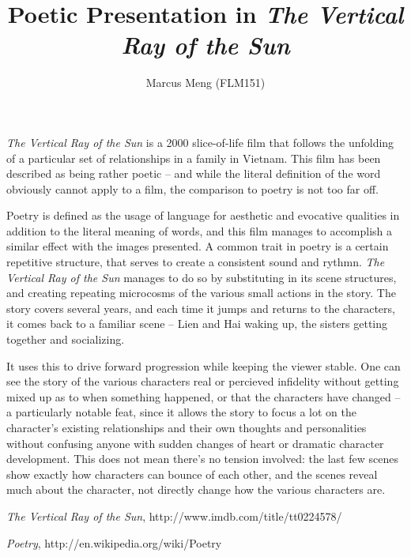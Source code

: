 \documentclass{article}
\title{Poetic Presentation in \emph{The Vertical Ray of the Sun}}
\author{Marcus Meng (FLM151)}
\begin{document}
\maketitle

\emph{The Vertical Ray of the Sun} is a 2000 slice-of-life film that follows the unfolding of a particular set of relationships in a family in Vietnam.
This film has been described as being rather poetic -- and while the literal definition of the word obviously cannot apply to a film, the comparison to poetry is not too far off.

Poetry is defined as the usage of language for aesthetic and evocative qualities in addition to the literal meaning of words, and this film manages to accomplish a similar effect with the images presented.
A common trait in poetry is a certain repetitive structure, that serves to create a consistent sound and rythmn.
\emph{The Vertical Ray of the Sun} manages to do so by substituting in its scene structures, and creating repeating microcosms of the various small actions in the story.
The story covers several years, and each time it jumps and returns to the characters, it comes back to a familiar scene -- Lien and Hai waking up, the sisters getting together and socializing.

It uses this to drive forward progression while keeping the viewer stable.
One can see the story of the various characters real or percieved infidelity without getting mixed up as to when something happened, or that the characters have changed --
a particularly notable feat, since it allows the story to focus a lot on the character's existing relationships and their own thoughts and personalities without confusing anyone with sudden changes of heart or dramatic character development.
This does not mean there's no tension involved: the last few scenes show exactly how characters can bounce of each other, and the scenes reveal much about the character, not directly change how the various characters are.

\begin{thebibliography}{9}

	\emph{The Vertical Ray of the Sun}, http://www.imdb.com/title/tt0224578/

	\emph{Poetry}, http://en.wikipedia.org/wiki/Poetry

\end{thebibliography}
\end{document}
